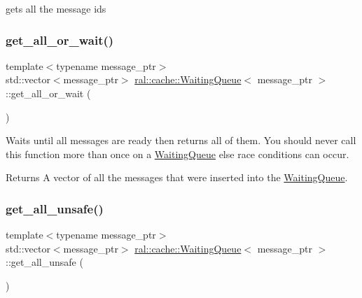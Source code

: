 gets all the message ids \mbox{\label{classral_1_1cache_1_1WaitingQueue_a0f0d4eb7e1d573849af13ede6621f2ac}} 
\subsubsection{\texorpdfstring{get\+\_\+all\+\_\+or\+\_\+wait()}{get\_all\_or\_wait()}}
{\footnotesize\ttfamily template$<$typename message\+\_\+ptr$>$ \\
std\+::vector$<$message\+\_\+ptr$>$ \hyperlink{classral_1_1cache_1_1WaitingQueue}{ral\+::cache\+::\+Waiting\+Queue}$<$ message\+\_\+ptr $>$\+::get\+\_\+all\+\_\+or\+\_\+wait (\begin{DoxyParamCaption}{ }\end{DoxyParamCaption})\hspace{0.3cm}{\ttfamily [inline]}}

Waits until all messages are ready then returns all of them. You should never call this function more than once on a \hyperlink{classral_1_1cache_1_1WaitingQueue}{Waiting\+Queue} else race conditions can occur. \begin{DoxyReturn}{Returns}
A vector of all the messages that were inserted into the \hyperlink{classral_1_1cache_1_1WaitingQueue}{Waiting\+Queue}. 
\end{DoxyReturn}
\mbox{\label{classral_1_1cache_1_1WaitingQueue_a6b0d10905ba8ab60f8d171d494e9ed7a}} 
\subsubsection{\texorpdfstring{get\+\_\+all\+\_\+unsafe()}{get\_all\_unsafe()}}
{\footnotesize\ttfamily template$<$typename message\+\_\+ptr$>$ \\
std\+::vector$<$message\+\_\+ptr$>$ \hyperlink{classral_1_1cache_1_1WaitingQueue}{ral\+::cache\+::\+Waiting\+Queue}$<$ message\+\_\+ptr $>$\+::get\+\_\+all\+\_\+unsafe (\begin{DoxyParamCaption}{ }\end{DoxyParamCaption})\hspace{0.3cm}{\ttfamily [inline]}}

